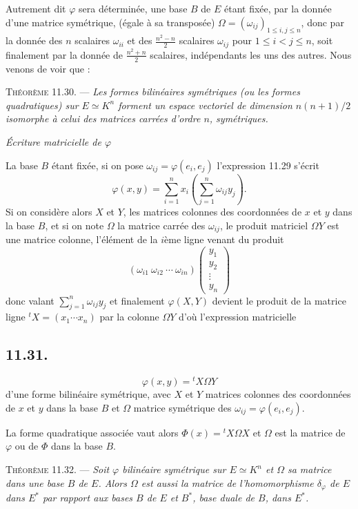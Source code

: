 Autrement dit $\varphi$ sera déterminée, une base $B$ de $E$ étant fixée, par la donnée d'une matrice symétrique, (égale à sa transposée) $\Omega=(\omega_{ij})_{1\le i,j\le n}$, donc par la donnée des $n$ scalaires $\omega_{ii}$ et des $\frac{n^2-n}{2}$ scalaires $\omega_{ij}$ pour $1\le i<j\le n$, soit finalement par la donnée de $\frac{n^2+n}{2}$ scalaires, indépendants les uns des autres. Nous venons de voir que :

\medskip\noindent\textsc{Théorème 11.30.} --- \emph{Les formes bilinéaires symétriques (ou les formes quadratiques) sur $E\simeq K^n$ forment un espace vectoriel de dimension $n(n+1)/2$ isomorphe à celui des matrices carrées d'ordre $n$, symétriques.} \bookend

\medskip\noindent\textit{Écriture matricielle de $\varphi$}

La base $B$ étant fixée, si on pose $\omega_{ij}=\varphi(e_i,e_j)$ l'expression 11.29 s'écrit
\[
\varphi(x,y)=\sum_{i=1}^n x_i\left(\sum_{j=1}^n\omega_{ij}y_j\right).
\]
Si on considère alors $X$ et $Y$, les matrices colonnes des coordonnées de $x$ et $y$ dans la base $B$, et si on note $\Omega$ la matrice carrée des $\omega_{ij}$, le produit matriciel $\Omega Y$ est une matrice colonne, l'élément de la $i$ème ligne venant du produit
\[
(\omega_{i1}\ \omega_{i2}\ \cdots\ \omega_{in})
\begin{pmatrix}y_1\\y_2\\\vdots\\y_n\end{pmatrix}
\]
donc valant $\sum_{j=1}^n\omega_{ij}y_j$ et finalement $\varphi(X,Y)$ devient le produit de la matrice ligne ${}^tX=(x_1\cdots x_n)$ par la colonne $\Omega Y$ d'où l'expression matricielle

\subsection*{11.31.}
\[
\varphi(x,y)={}^tX\Omega Y
\]
d'une forme bilinéaire symétrique, avec $X$ et $Y$ matrices colonnes des coordonnées de $x$ et $y$ dans la base $B$ et $\Omega$ matrice symétrique des $\omega_{ij}=\varphi(e_i,e_j)$.

La forme quadratique associée vaut alors $\Phi(x)={}^tX\Omega X$ et $\Omega$ est la matrice de $\varphi$ ou de $\Phi$ dans la base $B$.

\medskip\noindent\textsc{Théorème 11.32.} --- \emph{Soit $\varphi$ bilinéaire symétrique sur $E\simeq K^n$ et $\Omega$ sa matrice dans une base $B$ de $E$. Alors $\Omega$ est aussi la matrice de l'homomorphisme $\delta_\varphi$ de $E$ dans $E^*$ par rapport aux bases $B$ de $E$ et $B^*$, base duale de $B$, dans $E^*$.}

